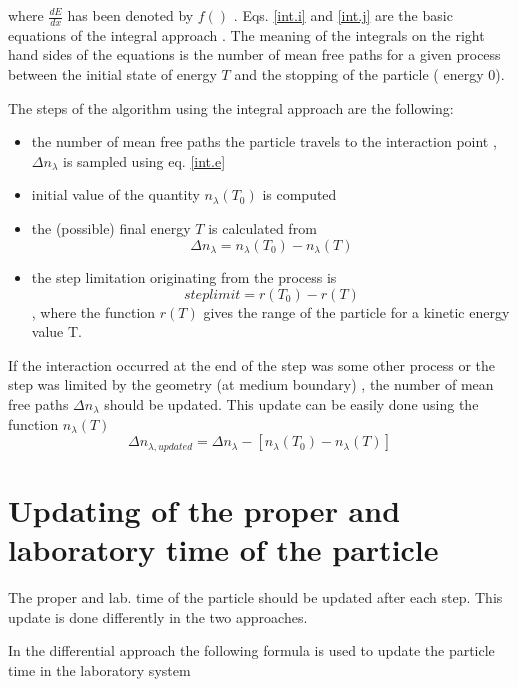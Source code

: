 where $\frac{dE}{dx}$ has been denoted by $f()$ . Eqs. \ref{int.i} and \ref{int.j} are
the basic equations of the integral approach . The meaning of the integrals
on the right hand sides of the equations is the number of mean free paths
 for a given process between the initial state of energy $T$ and the stopping
 of the particle ( energy $0$). 

 The steps of the algorithm using the integral approach are the following:
\begin{itemize}
\item the number of mean free paths the particle travels to the interaction
      point , $\Delta n_\lambda$ is sampled using eq. \ref{int.e}
\item initial value of the quantity $n_\lambda (T_0)$ is computed 
\item the (possible) final energy $T$ is calculated from 
  \begin{equation}
  \label{int.k}
   \Delta n_\lambda = n_\lambda (T_0) - n_\lambda (T)
  \end{equation}

\item the step limitation originating from the process is
   \begin{equation}
  \label{int.l}
   steplimit = r(T_0) - r(T)      
  \end{equation},
  where the function $r(T)$ gives the range of the particle for a kinetic
 energy value T.
\end{itemize}
 
 If the interaction occurred at the end of the step was  some other
process or the step was limited by 
the geometry (at medium boundary) , the number of mean free
paths $\Delta n_\lambda$ should be updated. This update can be easily done
 using the function $n_\lambda (T)$
\begin{equation}
\label{int.m}
 \Delta n_{\lambda,updated} =  \Delta n_\lambda - [n_\lambda (T_0)-
                                    n_\lambda (T) ]  
\end{equation}
  
\section{Updating of the proper and laboratory time of the particle}

 The proper and lab. time of the particle should be updated after each step.
This update is done differently in the two approaches.

 In the differential approach the following formula is used to update the
particle time in the laboratory system

